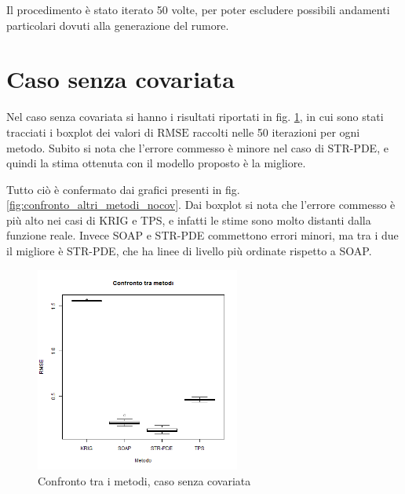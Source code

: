 \documentclass[a4paper,11pt,twoside,openright]{book}							%
\begin{document}
Il procedimento è stato iterato 50 volte, per poter escludere possibili andamenti particolari dovuti alla generazione del rumore.

\newpage
\section{Caso senza covariata}
Nel caso senza covariata si hanno i risultati riportati in fig. \ref{fig:cfr}, in cui sono stati tracciati i boxplot dei valori di $\mathrm{RMSE}$ raccolti nelle 50 iterazioni per ogni metodo. Subito si nota che l'errore commesso è minore nel caso di STR-PDE, e quindi la stima ottenuta con il modello proposto è la migliore.

Tutto ciò è confermato dai grafici presenti in fig. \ref{fig:confronto_altri_metodi_nocov}. Dai boxplot si nota che l'errore commesso è più alto nei casi di KRIG e TPS, e infatti le stime sono molto distanti dalla funzione reale. Invece SOAP e STR-PDE commettono errori minori, ma tra i due il migliore è STR-PDE, che ha linee di livello più ordinate rispetto a SOAP. 

\begin{figure}[t]
	\centering
	\includegraphics[width=0.60\textwidth]{Immagini/Confronto_metodi.png}   
	\caption{Confronto tra i metodi, caso senza covariata}
	\label{fig:cfr}
\end{figure}
\end{document}
